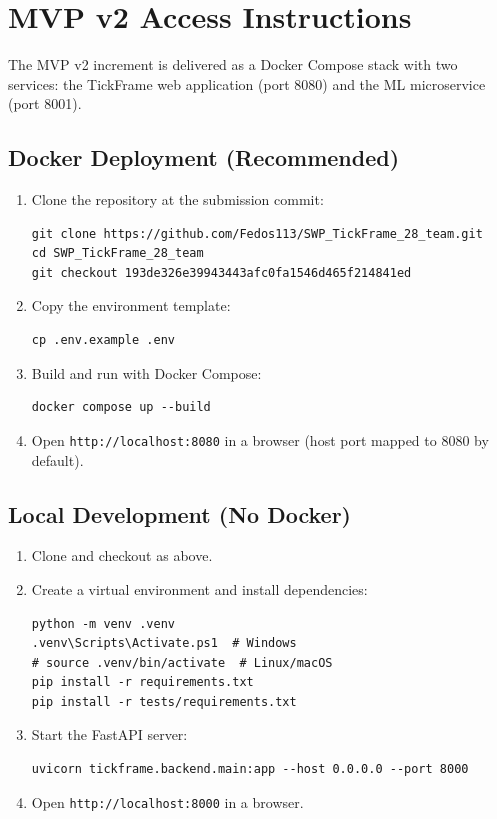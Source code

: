 \documentclass[11pt,a4paper]{article}
\begin{document}
\section{MVP v2 Access Instructions}

The MVP v2 increment is delivered as a Docker Compose stack with two services: the TickFrame web application (port 8080) and the ML microservice (port 8001).

\subsection{Docker Deployment (Recommended)}
\begin{enumerate}[leftmargin=*]
    \item Clone the repository at the submission commit:
\begin{verbatim}
git clone https://github.com/Fedos113/SWP_TickFrame_28_team.git
cd SWP_TickFrame_28_team
git checkout 193de326e39943443afc0fa1546d465f214841ed
\end{verbatim}
    \item Copy the environment template:
\begin{verbatim}
cp .env.example .env
\end{verbatim}
    \item Build and run with Docker Compose:
\begin{verbatim}
docker compose up --build
\end{verbatim}
    \item Open \texttt{http://localhost:8080} in a browser (host port mapped to 8080 by default).
\end{enumerate}

\subsection{Local Development (No Docker)}
\begin{enumerate}[leftmargin=*]
    \item Clone and checkout as above.
    \item Create a virtual environment and install dependencies:
\begin{verbatim}
python -m venv .venv
.venv\Scripts\Activate.ps1  # Windows
# source .venv/bin/activate  # Linux/macOS
pip install -r requirements.txt
pip install -r tests/requirements.txt
\end{verbatim}
    \item Start the FastAPI server:
\begin{verbatim}
uvicorn tickframe.backend.main:app --host 0.0.0.0 --port 8000
\end{verbatim}
    \item Open \texttt{http://localhost:8000} in a browser.
\end{enumerate}
\end{document}
